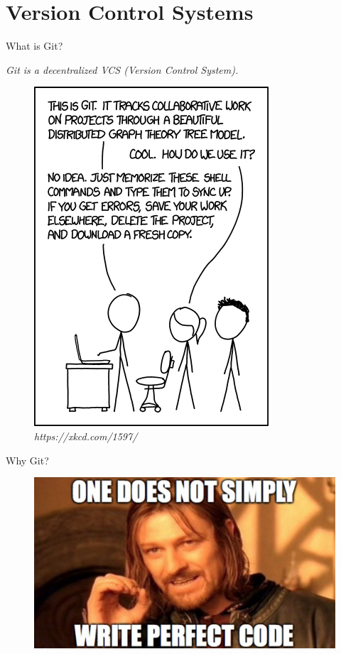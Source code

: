 \section{Version Control Systems}

\begin{frame}[fragile]{What is Git?}

    \emph{Git is a decentralized VCS (Version Control System).}

    \begin{figure}
        \centering
        \includegraphics[height=0.6\textheight]{img/xkcdgit.png}
        \caption{\textit{https://xkcd.com/1597/}}
    \end{figure}

\end{frame}

\begin{frame}[fragile]{Why Git?}

    \begin{figure}
        \centering
        \includegraphics[height=0.6\textheight]{img/does_not_simply.png}
    \end{figure}

\end{frame}

